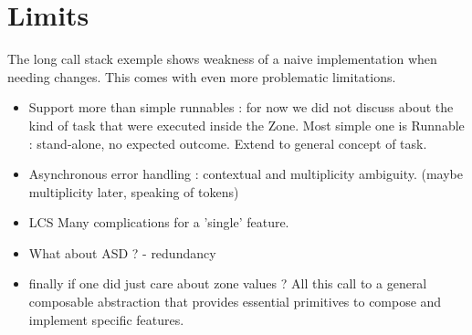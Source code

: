 \section{Limits}

The long call stack exemple shows weakness of a naive implementation when needing changes. This comes with even more problematic limitations.

\begin{itemize}
\item Support more than simple runnables : for now we did not discuss about the kind of task that were executed inside the Zone. Most simple one is Runnable : stand-alone, no expected outcome. Extend to general concept of task.
\item Asynchronous error handling : contextual and multiplicity ambiguity. (maybe multiplicity later, speaking of tokens)
\item LCS Many complications for a 'single' feature.
\item What about ASD ? - redundancy
\item finally if one did just care about zone values ? All this call to a general composable abstraction that provides essential primitives to compose and implement specific features.
\end{itemize}